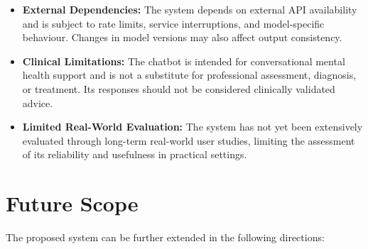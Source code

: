 \documentclass[conference]{IEEEtran}
\begin{document}
\begin{itemize}
    \item \textbf{External Dependencies:} The system depends on external API availability and is subject to rate limits, service interruptions, and model-specific behaviour. Changes in model versions may also affect output consistency.

    \item \textbf{Clinical Limitations:} The chatbot is intended for conversational mental health support and is not a substitute for professional assessment, diagnosis, or treatment. Its responses should not be considered clinically validated advice.

    \item \textbf{Limited Real-World Evaluation:} The system has not yet been extensively evaluated through long-term real-world user studies, limiting the assessment of its reliability and usefulness in practical settings.
\end{itemize}
\section{Future Scope}

The proposed system can be further extended in the following directions:
\end{document}

